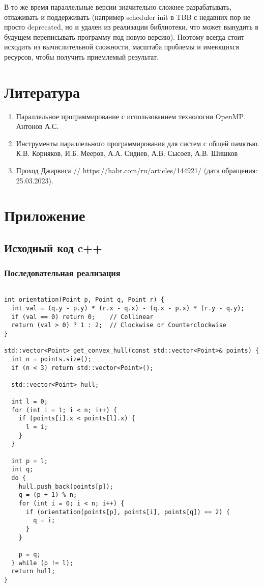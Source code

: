 \documentclass[14pt, a4paper]{extarticle}
\begin{document}
В то же время параллельные версии значительно сложнее разрабатывать, отлаживать и поддерживать (например scheduler init в TBB с недавних пор не просто deprecated, но и удален из реализации библиотеки, что может вынудить в будущем переписывать программу под новую версию). Поэтому всегда стоит исходить из вычислительной сложности, масштаба проблемы и имеющихся ресурсов, чтобы получить приемлемый результат. 
 
  \newpage

    \section{Литература}
    
    \begin{enumerate}
        \item Параллельное программирование с использованием технологии OpenMP. Антонов А.С.
        \item Инструменты параллельного программирования для систем с общей памятью. К.В. Корняков, И.Б. Мееров, А.А. Сиднев, А.В. Сысоев, А.В. Шишков
        \item  Проход Джарвиса // https://habr.com/ru/articles/144921/ (дата обращения: 25.03.2023). 
    \end{enumerate}

  \newpage

  \section{Приложение}
\subsection{Исходный код c++}
  \subsubsection{Последовательная реализация}
  \begin{lstlisting}

int orientation(Point p, Point q, Point r) {
  int val = (q.y - p.y) * (r.x - q.x) - (q.x - p.x) * (r.y - q.y);
  if (val == 0) return 0;    // Collinear
  return (val > 0) ? 1 : 2;  // Clockwise or Counterclockwise
}

std::vector<Point> get_convex_hull(const std::vector<Point>& points) {
  int n = points.size();
  if (n < 3) return std::vector<Point>();

  std::vector<Point> hull;

  int l = 0;
  for (int i = 1; i < n; i++) {
    if (points[i].x < points[l].x) {
      l = i;
    }
  }

  int p = l;
  int q;
  do {
    hull.push_back(points[p]);
    q = (p + 1) % n;
    for (int i = 0; i < n; i++) {
      if (orientation(points[p], points[i], points[q]) == 2) {
        q = i;
      }
    }

    p = q;
  } while (p != l);
  return hull;
}

  \end{lstlisting}
  \newpage
\end{document}
